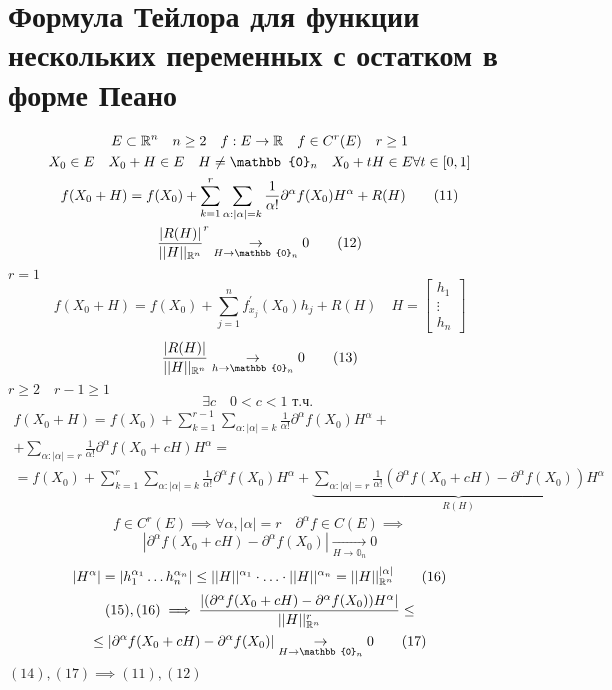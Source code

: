 \documentclass[main]{subfiles}
\begin{document}
\section{Формула Тейлора для функции нескольких переменных с остатком в форме Пеано}

\begin{gather*}
    E \subset \vR^n \quad n \geq 2 \quad f: E \rightarrow \vR \quad f \in C^r(E) \quad r \geq 1 \\
    X_0 \in E \quad X_0 + H \in E \quad H \ne \mathbb{0}_n  \quad X_0 + tH \in E \forall t \in [0,1] \\
    f(X_0 + H) = f(X_0) + \sum^r_{k=1} \sum_{\alpha: |\alpha| = k} \frac{1}{\alpha!} \partial^\alpha f (X_0) H^\alpha + R(H) \tag{11}\\
    \frac{|R(H)|}{||H||_{\vR^n}}^r \underset{H \to \mathbb{0}_n}{\rightarrow} 0 \tag{12} \\
\end{gather*}
$r=1$
\[ f(X_0+H) = f(X_0) + \sum^n_{j=1} f^\prime_{x_j}(X_0)h_j + R(H) \quad H = \begin{bmatrix}
    h_1 \\
    \vdots \\
    h_n
\end{bmatrix} \tag{13\prime}\]
\[\frac{|R(H)|}{||H||_{\vR^n}} \underset{h \to \mathbb{0}_n}{\rightarrow} 0 \tag{13} \]
$r \geq 2 \quad r - 1 \geq 1 $
    \[\exists c \quad 0  < c < 1 \text{ т.ч. } \]
    \begin{multline*}
        f(X_0+H) = f(X_0) + \sum^{r-1}_{k=1}\sum_{\alpha: |\alpha| = k} \frac{1}{\alpha!} \partial^\alpha f(X_0)H^\alpha + \\
        + \sum_{\alpha: |\alpha| = r} \frac{1}{\alpha!} \partial^\alpha f(X_0 + cH) H^\alpha = \\
        = f(X_0) + \sum_{k=1}^r \sum_{\alpha: |\alpha| = k} \frac{1}{\alpha!} \partial^\alpha f(X_0) H^\alpha + 
        \underbrace{\sum_{\alpha: |\alpha|=r} \frac{1}{\alpha!}(\partial^\alpha f(X_0 + cH) - \partial^\alpha f(X_0))H^\alpha}_{R(H)} \tag{14} 
    \end{multline*}
    \[f \in C^r(E) \implies \forall \alpha, |\alpha| = r \quad \partial^\alpha f \in C(E) \implies \] 
    \[ |\partial^\alpha f(X_0 + cH) - \partial^\alpha f(X_0)| \underset{H \to \mathbb{0}_n}{\rightarrow} 0  \tag{15} \]
    \[|H^\alpha| = |h_1^{\alpha_1} \ldots h_n^{\alpha_n}| \leq ||H||^{\alpha_1} \cdot \ldots \cdot ||H||^{\alpha_n} = ||H||^{|\alpha|}_{\mathbb{R}^n} \tag{16} \]
    \begin{multline*}
        (15), (16) \implies \frac{|(\partial^\alpha f (X_0 + cH) - \partial^\alpha f(X_0))H^\alpha|}{||H||_{\vR^n}^r} \leq \\
    \leq |\partial^\alpha f(X_0 + cH) - \partial^\alpha f(X_0)| \underset{H \to \mathbb{0}_n}{\rightarrow}  0 \tag{17}
    \end{multline*}
    $(14), (17) \implies (11), (12) $
\end{document}
